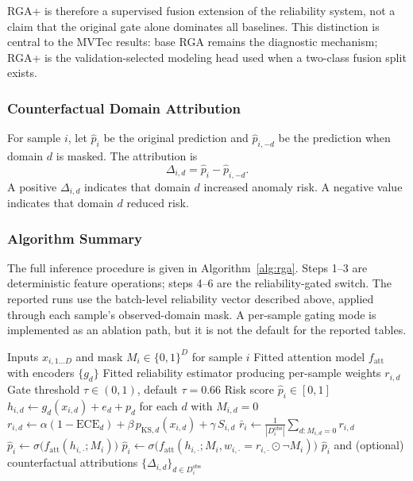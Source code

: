 \documentclass[10pt,conference]{IEEEtran}
\newcommand{\method}{RGA}
\newcommand{\methodplus}{RGA+}
\begin{document}
\methodplus{} is therefore a supervised fusion extension of the reliability
system, not a claim that the original gate alone dominates all baselines. This
distinction is central to the MVTec results: base \method{} remains the
diagnostic mechanism; \methodplus{} is the validation-selected modeling head
used when a two-class fusion split exists.

\subsubsection{Counterfactual Domain Attribution}
For sample $i$, let $\hat{p}_i$ be the original prediction and
$\hat{p}_{i,-d}$ be the prediction when domain $d$ is masked. The attribution is
\begin{equation}
  \Delta_{i,d} = \hat{p}_i - \hat{p}_{i,-d}.
\end{equation}
A positive $\Delta_{i,d}$ indicates that domain $d$ increased anomaly risk. A
negative value indicates that domain $d$ reduced risk.

\subsubsection{Algorithm Summary}
The full inference procedure is given in Algorithm~\ref{alg:rga}. Steps 1--3
are deterministic feature operations; steps 4--6 are the reliability-gated
switch. The reported runs use the batch-level reliability vector described
above, applied through each sample's observed-domain mask. A per-sample gating
mode is implemented as an ablation path, but it is not the default for the
reported tables.

\begin{algorithm}[t]
\caption{\method{} inference}
\label{alg:rga}
\begin{algorithmic}[1]
\Require Inputs $x_{i,1\ldots D}$ and mask $M_i \in \{0,1\}^D$ for sample $i$
\Require Fitted attention model $f_{\text{att}}$ with encoders $\{g_d\}$
\Require Fitted reliability estimator producing per-sample weights $r_{i,d}$
\Require Gate threshold $\tau \in (0,1)$, default $\tau = 0.66$
\Ensure Risk score $\hat p_i \in [0,1]$
\State $h_{i,d} \gets g_d(x_{i,d}) + e_d + p_d$ for each $d$ with $M_{i,d} = 0$
\State $r_{i,d} \gets \alpha(1-\mathrm{ECE}_d) + \beta\, p_{\mathrm{KS},d}(x_{i,d}) + \gamma\, S_{i,d}$
\State $\bar r_i \gets \frac{1}{|D_i^{\text{obs}}|} \sum_{d: M_{i,d}=0} r_{i,d}$
    \State $\hat p_i \gets \sigma\bigl(f_{\text{att}}(h_{i,\cdot}; M_i)\bigr)$ 
\Else
    \State $\hat p_i \gets \sigma\bigl(f_{\text{att}}(h_{i,\cdot}; M_i, w_{i,\cdot} {=} r_{i,\cdot} \odot \neg M_i)\bigr)$
    \State \hspace{1em} 
\EndIf
\State \Return $\hat p_i$ and (optional) counterfactual attributions $\{\Delta_{i,d}\}_{d \in D_i^{\text{obs}}}$
\end{algorithmic}
\end{algorithm}
\end{document}
